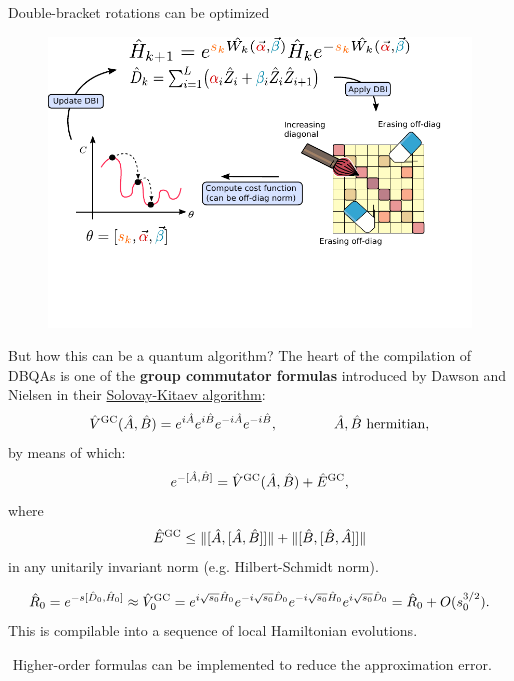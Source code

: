 \documentclass[aspectratio=169, 8pt, xcolor={svgnames}]{beamer}
\begin{document}
\begin{frame}{Double-bracket rotations can be optimized}
\begin{center}
\begin{figure}
   \includegraphics[width=1\textwidth]{figures/dbi_scheme_ink.pdf}
\end{figure}
\end{center}
\end{frame}

\begin{frame}{But how this can be a quantum algorithm?}
The heart of the compilation of DBQAs is one of the \textbf{group commutator formulas} introduced
by Dawson and Nielsen in their \href{https://arxiv.org/abs/quant-ph/0505030}{Solovay-Kitaev algorithm}:
$$ \hat{V}^{\rm GC}(\hat{A}, \hat{B}) = e^{i\hat{A}} e^{i\hat{B}} e^{-i\hat{A}} e^{-i\hat{B}}, \qquad \qquad \hat{A}, \hat{B} \,\,\text{hermitian},$$
by means of which:
$$ e^{-[\hat{A}, \hat{B}]} = \hat{V}^{\rm GC}(\hat{A}, \hat{B}) + \hat{E}^{\rm GC}, $$
where 
$$  \hat{E}^{\rm GC} \leq \| [ \hat{A}, [\hat{A}, \hat{B}]] \| + \| [ \hat{B}, [\hat{B}, \hat{A}]] \|$$
in any unitarily invariant norm (e.g. Hilbert-Schmidt norm).

\begin{tcolorbox}[colback=red!15, title=How about DBI?]
$$ \hat{R}_0  = e^{- s [\hat{D}_0, \hat{H}_0]} \approx \hat{V}^{\rm GC}_0 = e^{i \sqrt{s_0}\hat{H}_0} 
e^{-i \sqrt{s_0}\hat{D}_0} e^{-i \sqrt{s_0}\hat{H}_0} e^{i \sqrt{s_0}\hat{D}_0} = \hat{R}_0 + O(s_0^{3/2}).$$
This is compilable into a sequence of local Hamiltonian evolutions.
\end{tcolorbox}
\faExclamationCircle\,\,Higher-order formulas can be implemented to reduce the approximation error.
\end{frame}
\end{document}
